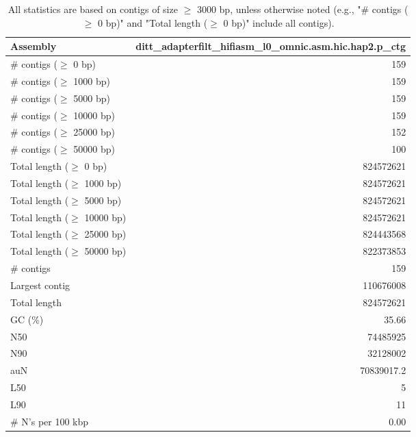 \documentclass[12pt,a4paper]{article}
\begin{document}
\begin{table}[ht]
\begin{center}
\caption{All statistics are based on contigs of size $\geq$ 3000 bp, unless otherwise noted (e.g., "\# contigs ($\geq$ 0 bp)" and "Total length ($\geq$ 0 bp)" include all contigs).}
\begin{tabular}{|l*{1}{|r}|}
\hline
Assembly & ditt\_adapterfilt\_hifiasm\_l0\_omnic.asm.hic.hap2.p\_ctg \\ \hline
\# contigs ($\geq$ 0 bp) & 159 \\ \hline
\# contigs ($\geq$ 1000 bp) & 159 \\ \hline
\# contigs ($\geq$ 5000 bp) & 159 \\ \hline
\# contigs ($\geq$ 10000 bp) & 159 \\ \hline
\# contigs ($\geq$ 25000 bp) & 152 \\ \hline
\# contigs ($\geq$ 50000 bp) & 100 \\ \hline
Total length ($\geq$ 0 bp) & 824572621 \\ \hline
Total length ($\geq$ 1000 bp) & 824572621 \\ \hline
Total length ($\geq$ 5000 bp) & 824572621 \\ \hline
Total length ($\geq$ 10000 bp) & 824572621 \\ \hline
Total length ($\geq$ 25000 bp) & 824443568 \\ \hline
Total length ($\geq$ 50000 bp) & 822373853 \\ \hline
\# contigs & 159 \\ \hline
Largest contig & 110676008 \\ \hline
Total length & 824572621 \\ \hline
GC (\%) & 35.66 \\ \hline
N50 & 74485925 \\ \hline
N90 & 32128002 \\ \hline
auN & 70839017.2 \\ \hline
L50 & 5 \\ \hline
L90 & 11 \\ \hline
\# N's per 100 kbp & 0.00 \\ \hline
\end{tabular}
\end{center}
\end{table}
\end{document}
